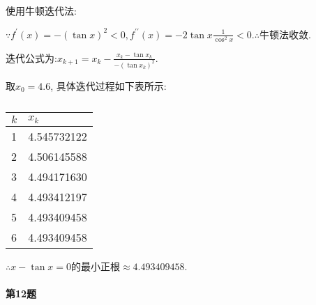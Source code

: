 \documentclass[a4paper]{article}
\begin{document}
\begin{enumerate}
    使用牛顿迭代法:\par
    $\because f^{\prime}(x)=-(\tan x)^{2} < 0, f^{\prime \prime}(x)=-2 \tan x \frac{1}{\cos ^{2} x} < 0. \therefore$牛顿法收敛. \par
    迭代公式为:$x_{k+1} = x_k - \frac{x_k - \tan x_k}{-(\tan x_k)^2}$.\par
    取$x_0 = 4.6$, 具体迭代过程如下表所示:\par
    \begin{table}[h]
        \centering
        \caption{}
        \label{tab:my-table}
        \begin{tabular}{ll}
        \hline
        $k$ & $x_k$ \\ \hline
        1 & 4.545732122 \\
        2 & 4.506145588 \\
        3 & 4.494171630 \\
        4 & 4.493412197 \\
        5 & 4.493409458 \\
        6 & 4.493409458 \\
        \hline 
        \end{tabular}
        \end{table} \par
    $\therefore x- \tan x = 0$的最小正根$\approx 4.493409458$.
\end{enumerate}

\paragraph{第12题}~{}
\\
\end{document}
